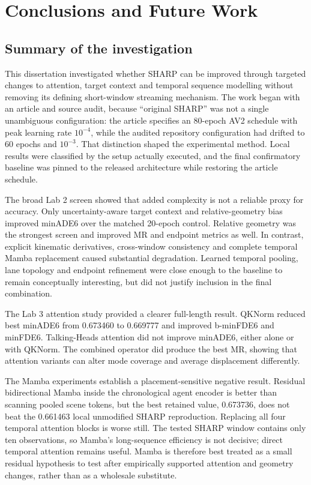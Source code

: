 \chapter{Conclusions and Future Work}
\label{chap:conclusion}

\section{Summary of the investigation}

This dissertation investigated whether SHARP can be improved through targeted changes to attention, target context and temporal sequence modelling without removing its defining short-window streaming mechanism. The work began with an article and source audit, because ``original SHARP'' was not a single unambiguous configuration: the article specifies an 80-epoch AV2 schedule with peak learning rate $10^{-4}$, while the audited repository configuration had drifted to 60 epochs and $10^{-3}$. That distinction shaped the experimental method. Local results were classified by the setup actually executed, and the final confirmatory baseline was pinned to the released architecture while restoring the article schedule.

The broad Lab 2 screen showed that added complexity is not a reliable proxy for accuracy. Only uncertainty-aware target context and relative-geometry bias improved minADE6 over the matched 20-epoch control. Relative geometry was the strongest screen and improved MR and endpoint metrics as well. In contrast, explicit kinematic derivatives, cross-window consistency and complete temporal Mamba replacement caused substantial degradation. Learned temporal pooling, lane topology and endpoint refinement were close enough to the baseline to remain conceptually interesting, but did not justify inclusion in the final combination.

The Lab 3 attention study provided a clearer full-length result. QKNorm reduced best minADE6 from 0.673460 to 0.669777 and improved b-minFDE6 and minFDE6. Talking-Heads attention did not improve minADE6, either alone or with QKNorm. The combined operator did produce the best MR, showing that attention variants can alter mode coverage and average displacement differently.

The Mamba experiments establish a placement-sensitive negative result. Residual bidirectional Mamba inside the chronological agent encoder is better than scanning pooled scene tokens, but the best retained value, 0.673736, does not beat the 0.661463 local unmodified SHARP reproduction. Replacing all four temporal attention blocks is worse still. The tested SHARP window contains only ten observations, so Mamba's long-sequence efficiency is not decisive; direct temporal attention remains useful. Mamba is therefore best treated as a small residual hypothesis to test after empirically supported attention and geometry changes, rather than as a wholesale substitute.

